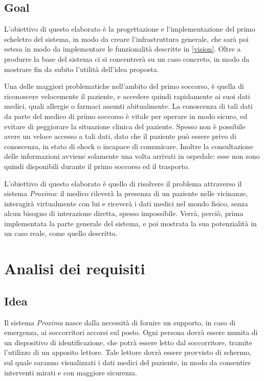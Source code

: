 \documentclass[a4paper,12pt]{report}
\begin{document}
\section{Goal} \label{goal}
L'obiettivo di questo elaborato è la progettazione e l'implementazione del primo scheletro del sistema, in modo da creare l'infrastruttura generale, che sarà poi estesa in modo da implementare le funzionalità descritte in \autoref{vision}. Oltre a produrre la base del sistema ci si concentrerà su un caso concreto, in modo da mostrare fin da subito l'utilità dell'idea proposta. 

Una delle maggiori problematiche nell'ambito del primo soccorso, è quella di riconoscere velocemente il paziente, e accedere quindi rapidamente ai suoi dati medici, quali allergie o farmaci assunti abitualmente. La conoscenza di tali dati da parte del medico di primo soccorso è vitale per operare in modo sicuro, ed evitare di peggiorare la situazione clinica del paziente. Spesso non è possibile avere un veloce accesso a tali dati, dato che il paziente può essere privo di conoscenza, in stato di shock o incapace di comunicare. Inoltre la consultazione delle informazioni avviene solamente una volta arrivati in ospedale: esse non sono quindi disponibili durante il primo soccorso ed il trasporto.

L'obiettivo di questo elaborato è quello di risolvere il problema attraverso il sistema \emph{Proxima}: il medico rileverà la presenza di un paziente nelle vicinanze, interagirà virtualmente con lui e riceverà i dati medici nel mondo fisico, senza alcun bisogno di interazione diretta, spesso impossibile. Verrà, perciò, prima implementata la parte generale del sistema, e poi mostrata la sua potenzialità in un caso reale, come quello descritto.  

\chapter{Analisi dei requisiti} \label{requirements}
\section{Idea}
Il sistema \emph{Proxima} nasce dalla necessità di fornire un supporto, in caso di emergenza, ai soccorritori accorsi sul posto. Ogni persona dovrà essere munita di un dispositivo di identificazione, che potrà essere letto dal soccorritore, tramite l'utilizzo di un apposito lettore. Tale lettore dovrà essere provvisto di schermo, sul quale saranno visualizzati i dati medici del paziente, in modo da consentire interventi mirati e con maggiore sicurezza. 
\end{document}
